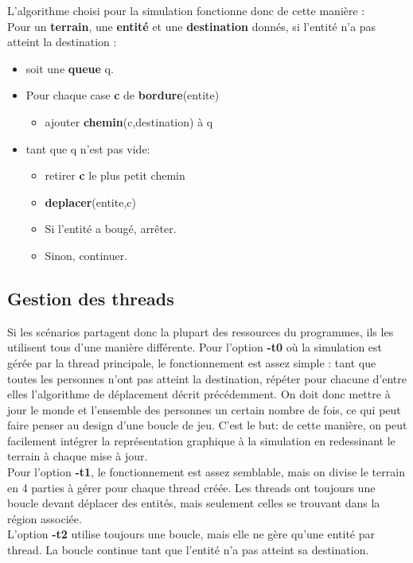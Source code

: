 \documentclass[11pt]{article} %
\begin{document}
\newpage

L'algorithme choisi pour la simulation fonctionne donc de cette manière : \\

Pour un \textbf{terrain}, une \textbf{entité}  et une \textbf{destination} donnés, si l'entité n'a pas atteint la destination :

\begin{itemize}
	\item soit une \textbf{queue} q.
	\item Pour chaque case \textbf{c} de \textbf{bordure}(entite)
\begin{itemize}
		\item ajouter \textbf{chemin}(c,destination) à q
	\end{itemize}

	\item tant que q  n'est pas vide:
	\begin{itemize}
		\item retirer \textbf{c} le plus petit chemin
		\item \textbf{deplacer}(entite,c)
		\item Si l'entité a bougé, arrêter.
		\item Sinon, continuer.
	\end{itemize}
	
\end{itemize}

\subsection{Gestion des threads}
Si les scénarios partagent donc la plupart des ressources du programmes, ils les utilisent tous d'une manière différente. 
Pour l'option \textbf{-t0} où la simulation est gérée par la thread principale, le fonctionnement est assez simple : tant que toutes les personnes n'ont pas atteint la destination, répéter pour chacune d'entre elles l'algorithme de déplacement décrit précédemment. On doit donc mettre à jour le monde et l'ensemble des personnes un certain nombre de fois, ce qui peut faire penser au design d'une boucle de jeu. C'est le but: de cette manière, on peut facilement intégrer la représentation graphique à la simulation en redessinant le terrain à chaque mise à jour. \\
Pour l'option \textbf{-t1}, le fonctionnement est assez semblable, mais on divise le terrain en 4 parties à gérer pour chaque thread créée. Les threads ont toujours une boucle devant déplacer des entités, mais seulement celles se trouvant dans la région associée. \\
L'option \textbf{-t2} utilise toujours une boucle, mais elle ne gère qu'une entité par thread. La boucle continue tant que l'entité n'a pas atteint sa destination.
\end{document}
